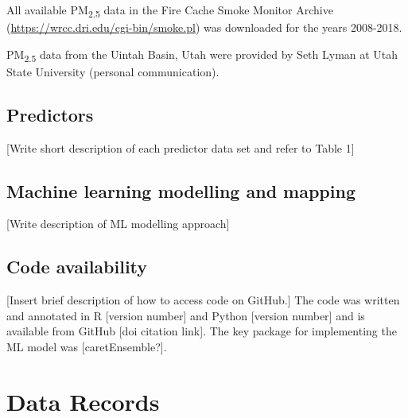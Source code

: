\documentclass[english]{article}
\begin{document}
All available PM\textsubscript{2.5} data in the Fire Cache Smoke Monitor Archive (\url{https://wrcc.dri.edu/cgi-bin/smoke.pl}) was downloaded for the years 2008-2018. 

PM\textsubscript{2.5} data from the Uintah Basin, Utah were provided by Seth Lyman at Utah State University (personal communication).


\subsection*{Predictors}

[Write short description of each predictor data set and refer to Table 1]

\subsection*{Machine learning modelling and mapping}

[Write description of ML modelling approach]

\subsection*{Code availability}


[Insert brief description of how to access code on GitHub.] The code was written and annotated in R [version number] and Python [version number] and is available from GitHub [doi citation link]. The key package for implementing the ML model was [caretEnsemble?]. 

\section*{Data Records}

\end{document}
